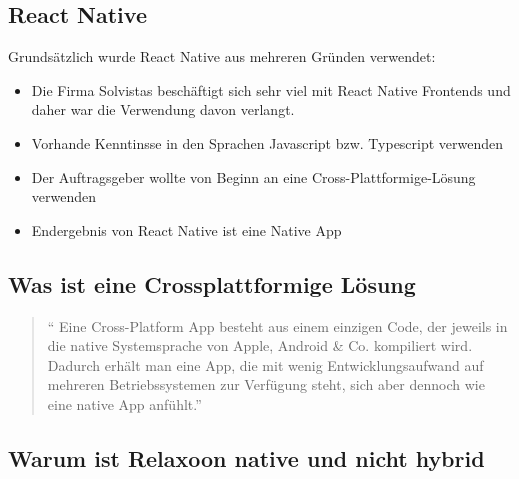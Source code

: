 \begin{spacing}{1}

    \section{React Native}

    Grundsätzlich wurde React Native aus mehreren Gründen verwendet:
    \begin{itemize}
        \item Die Firma Solvistas beschäftigt sich sehr viel mit React Native Frontends und daher war die Verwendung davon verlangt.
        \item Vorhande Kenntinsse in den Sprachen Javascript bzw. Typescript verwenden
        \item Der Auftragsgeber wollte von Beginn an eine Cross-Plattformige-Lösung verwenden
        \item Endergebnis von React Native ist eine Native App
    \end{itemize}




    \subsection{Was ist eine Crossplattformige Lösung}

    \begin{quotation}
        ``
        Eine Cross-Platform App besteht aus einem einzigen Code,
        der jeweils in die native Systemsprache von Apple, Android \& Co. kompiliert wird.
        Dadurch erhält man eine App, die mit wenig Entwicklungsaufwand auf mehreren
        Betriebssystemen zur Verfügung steht, sich aber dennoch wie eine native App
        anfühlt.''
        \cite{cross-plattform}

    \end{quotation}

    \subsection{Warum ist Relaxoon native und nicht hybrid}


\end{spacing}
